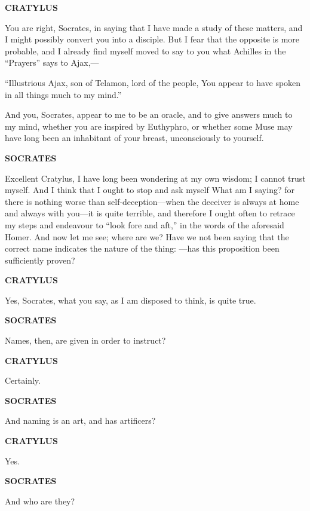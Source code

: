 \documentclass[11pt,letter]{article}
\begin{document}
\par \textbf{CRATYLUS}
\par   You are right, Socrates, in saying that I have made a study of these matters, and I might possibly convert you into a disciple. But I fear that the opposite is more probable, and I already find myself moved to say to you what Achilles in the “Prayers” says to Ajax,—

\par  “Illustrious Ajax, son of Telamon, lord of the people, You appear to have spoken in all things much to my mind.”

\par  And you, Socrates, appear to me to be an oracle, and to give answers much to my mind, whether you are inspired by Euthyphro, or whether some Muse may have long been an inhabitant of your breast, unconsciously to yourself.

\par \textbf{SOCRATES}
\par   Excellent Cratylus, I have long been wondering at my own wisdom; I cannot trust myself. And I think that I ought to stop and ask myself What am I saying? for there is nothing worse than self-deception—when the deceiver is always at home and always with you—it is quite terrible, and therefore I ought often to retrace my steps and endeavour to “look fore and aft,” in the words of the aforesaid Homer. And now let me see; where are we? Have we not been saying that the correct name indicates the nature of the thing: —has this proposition been sufficiently proven?

\par \textbf{CRATYLUS}
\par   Yes, Socrates, what you say, as I am disposed to think, is quite true.

\par \textbf{SOCRATES}
\par   Names, then, are given in order to instruct?

\par \textbf{CRATYLUS}
\par   Certainly.

\par \textbf{SOCRATES}
\par   And naming is an art, and has artificers?

\par \textbf{CRATYLUS}
\par   Yes.

\par \textbf{SOCRATES}
\par   And who are they?
\end{document}
